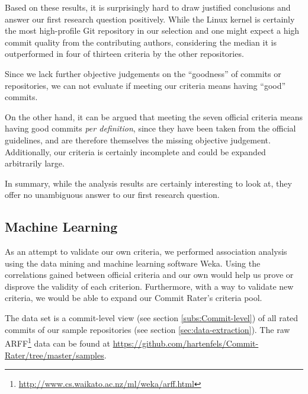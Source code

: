 Based on these results, it is surprisingly hard to draw justified conclusions and answer our first research question positively. While the Linux kernel is certainly the most high-profile Git repository in our selection and one might expect a high commit quality from the contributing authors, considering the median it is outperformed in four of thirteen criteria by the other repositories.

Since we lack further objective judgements on the ``goodness'' of commits or repositories, we can not evaluate if meeting our criteria means having ``good'' commits.

On the other hand, it can be argued that meeting the seven official criteria means having good commits \emph{per definition}, since they have been taken from the official guidelines, and are therefore themselves the missing objective judgement. Additionally, our criteria is certainly incomplete and could be expanded arbitrarily large.

In summary, while the analysis results are certainly interesting to look at, they offer no unambiguous answer to our first research question.

\subsection{Machine Learning}
\label{sec:results2}

As an attempt to validate our own criteria, we performed association analysis using the data mining and machine learning software Weka\cite{Weka}. Using the correlations gained between official criteria and our own would help us prove or disprove the validity of each criterion. Furthermore, with a way to validate new criteria, we would be able to expand our Commit Rater's criteria pool.

The data set is a commit-level view (see section \ref{subs:Commit-level}) of all rated commits of our sample repositories (see section \ref{sec:data-extraction}). The raw ARFF\footnote{\url{http://www.cs.waikato.ac.nz/ml/weka/arff.html}} data can be found at \url{https://github.com/hartenfels/Commit-Rater/tree/master/samples}.

